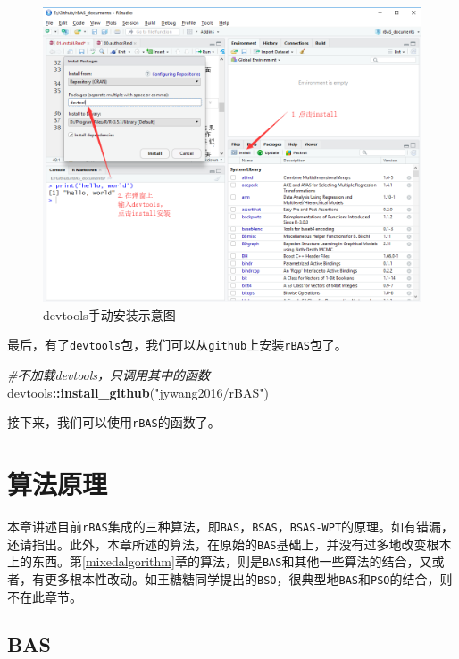 \documentclass[]{ctexbook}
\newenvironment{Shaded}{\begin{snugshade}}{\end{snugshade}}
\newcommand{\KeywordTok}[1]{\textcolor[rgb]{0.13,0.29,0.53}{\textbf{#1}}}
\newcommand{\StringTok}[1]{\textcolor[rgb]{0.31,0.60,0.02}{#1}}
\newcommand{\CommentTok}[1]{\textcolor[rgb]{0.56,0.35,0.01}{\textit{#1}}}
\newcommand{\OperatorTok}[1]{\textcolor[rgb]{0.81,0.36,0.00}{\textbf{#1}}}
\newcommand{\NormalTok}[1]{#1}
\begin{document}
\begin{figure}

{\centering \includegraphics[width=0.8\linewidth]{img/rBAS} 

}

\caption{devtools手动安装示意图}\label{fig:devtools}
\end{figure}

最后，有了\texttt{devtools}包，我们可以从\texttt{github}上安装\texttt{rBAS}包了。

\begin{Shaded}
\begin{Highlighting}[]
\CommentTok{#不加载devtools，只调用其中的函数}
\NormalTok{devtools}\OperatorTok{::}\KeywordTok{install_github}\NormalTok{(}\StringTok{"jywang2016/rBAS"}\NormalTok{)}
\end{Highlighting}
\end{Shaded}

接下来，我们可以使用\texttt{rBAS}的函数了。

\chapter{算法原理}\label{algorithm}

本章讲述目前\texttt{rBAS}集成的三种算法，即\texttt{BAS}，\texttt{BSAS}，\texttt{BSAS-WPT}的原理。如有错漏，还请指出。此外，本章所述的算法，在原始的\texttt{BAS}基础上，并没有过多地改变根本上的东西。第\ref{mixedalgorithm}章的算法，则是\texttt{BAS}和其他一些算法的结合，又或者，有更多根本性改动。如王糖糖同学提出的\texttt{BSO}，很典型地\texttt{BAS}和\texttt{PSO}的结合，则不在此章节。

\section{BAS}\label{bas}
\end{document}
